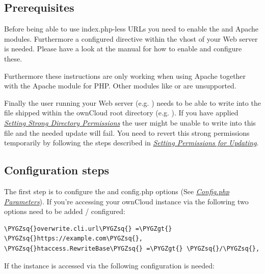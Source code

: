 \documentclass[letterpaper,10pt,english]{sphinxmanual}
\def\PYGZgt{\char`\>}
\def\PYGZsq{\char`\'}
\renewcommand\PYGZsq{\textquotesingle}
\begin{document}
\subsection{Prerequisites}
\label{configuration_server/index_php_less_urls:prerequisites}
Before being able to use index.php-less URLs you need to enable the  and
 Apache modules. Furthermore a configured  directive
within the vhost of your Web server is needed. Please have a look at the  manual
for how to enable and configure these.

Furthermore these instructions are only working when using Apache together with the 
Apache module for PHP. Other modules like  or  are unsupported.

Finally the user running your Web server (e.g. ) needs to be able to write into the
 file shipped within the ownCloud root directory (e.g. ).
If you have applied {\hyperref[installation/installation_wizard:strong\string-perms\string-label]{\emph{Setting Strong Directory Permissions}}} the user might be unable to write into this
file and the needed update will fail. You need to revert this strong permissions temporarily by
following the steps described in {\hyperref[maintenance/update:set\string-updating\string-permissions\string-label]{\emph{Setting Permissions for Updating}}}.


\subsection{Configuration steps}
\label{configuration_server/index_php_less_urls:configuration-steps}
The first step is to configure the  and 
config.php options (See {\hyperref[configuration_server/config_sample_php_parameters::doc]{\emph{\emph{Config.php Parameters}}}}). If you're accessing
your ownCloud instance via  the following two options need
to be added / configured:

\begin{Verbatim}[commandchars=\\\{\}]
\PYGZsq{}overwrite.cli.url\PYGZsq{} =\PYGZgt{} \PYGZsq{}https://example.com\PYGZsq{},
\PYGZsq{}htaccess.RewriteBase\PYGZsq{} =\PYGZgt{} \PYGZsq{}/\PYGZsq{},
\end{Verbatim}

If the instance is accessed via  the following
configuration is needed:
\end{document}
